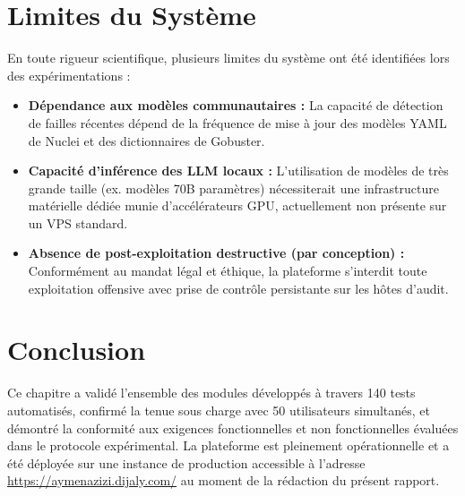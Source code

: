 \section{Limites du Syst\`eme}
\par En toute rigueur scientifique, plusieurs limites du syst\`eme ont \'et\'e identifi\'ees lors des exp\'erimentations :
\begin{itemize}
    \item \textbf{D\'ependance aux mod\`eles communautaires :} La capacit\'e de d\'etection de failles r\'ecentes d\'epend de la fr\'equence de mise \`a jour des mod\`eles YAML de Nuclei et des dictionnaires de Gobuster.
    \item \textbf{Capacit\'e d'inf\'erence des LLM locaux :} L'utilisation de mod\`eles de tr\`es grande taille (ex. mod\`eles 70B param\`etres) n\'ecessiterait une infrastructure mat\'erielle d\'edi\'ee munie d'acc\'el\'erateurs GPU, actuellement non pr\'esente sur un VPS standard.
    \item \textbf{Absence de post-exploitation destructive (par conception) :} Conform\'ement au mandat l\'egal et \'ethique, la plateforme s'interdit toute exploitation offensive avec prise de contr\^ole persistante sur les h\^otes d'audit.
\end{itemize}

\section*{Conclusion}
\par Ce chapitre a valid\'e l'ensemble des modules d\'evelopp\'es \`a travers 140 tests automatis\'es, confirm\'e la tenue sous charge avec 50 utilisateurs simultan\'es, et d\'emontr\'e la conformit\'e aux exigences fonctionnelles et non fonctionnelles \'evalu\'ees dans le protocole exp\'erimental. La plateforme est pleinement op\'erationnelle et a \'et\'e d\'eploy\'ee sur une instance de production accessible \`a l'adresse \url{https://aymenazizi.dijaly.com/} au moment de la r\'edaction du pr\'esent rapport.
